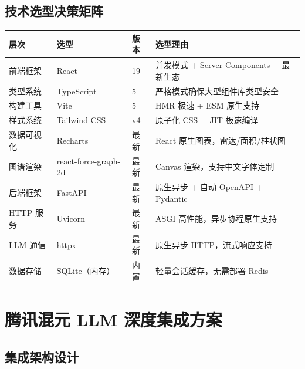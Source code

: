 \documentclass[12pt,a4paper]{ctexart}
\begin{document}
\begin{center}
\end{center}

\subsection{技术选型决策矩阵}

\begin{center}
{\small
\begin{tabular}{p{2.5cm} p{3.5cm} p{3cm} p{5cm}}
\toprule
\textbf{层次} & \textbf{选型} & \textbf{版本} & \textbf{选型理由} \\
\midrule
前端框架 & React & 19 & 并发模式 + Server Components + 最新生态 \\[2pt]
类型系统 & TypeScript & 5 & 严格模式确保大型组件库类型安全 \\[2pt]
构建工具 & Vite & 5 & HMR 极速 + ESM 原生支持 \\[2pt]
样式系统 & Tailwind CSS & v4 & 原子化 CSS + JIT 极速编译 \\[2pt]
数据可视化 & Recharts & 最新 & React 原生图表，雷达/面积/柱状图 \\[2pt]
图谱渲染 & react-force-graph-2d & 最新 & Canvas 渲染，支持中文字体定制 \\[2pt]
后端框架 & FastAPI & 最新 & 原生异步 + 自动 OpenAPI + Pydantic \\[2pt]
HTTP 服务 & Uvicorn & 最新 & ASGI 高性能，异步协程原生支持 \\[2pt]
LLM 通信 & httpx & 最新 & 原生异步 HTTP，流式响应支持 \\[2pt]
数据存储 & SQLite（内存） & 内置 & 轻量会话缓存，无需部署 Redis \\
\bottomrule
\end{tabular}
}
\end{center}


\section{腾讯混元 LLM 深度集成方案}

\subsection{集成架构设计}
\end{document}
